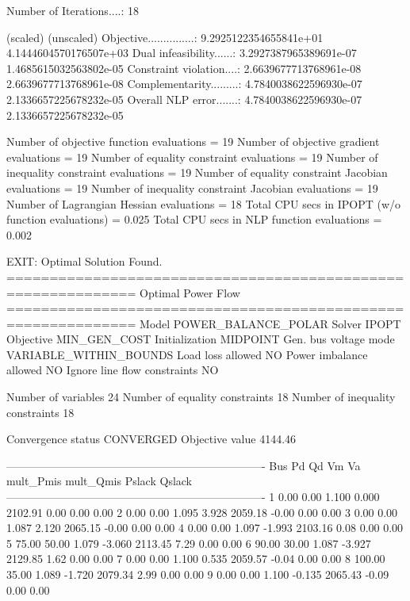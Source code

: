Number of Iterations....: 18

                                   (scaled)                 (unscaled)
Objective...............:   9.2925122354655841e+01    4.1444604570176507e+03
Dual infeasibility......:   3.2927387965389691e-07    1.4685615032563802e-05
Constraint violation....:   2.6639677713768961e-08    2.6639677713768961e-08
Complementarity.........:   4.7840038622596930e-07    2.1336657225678232e-05
Overall NLP error.......:   4.7840038622596930e-07    2.1336657225678232e-05


Number of objective function evaluations             = 19
Number of objective gradient evaluations             = 19
Number of equality constraint evaluations            = 19
Number of inequality constraint evaluations          = 19
Number of equality constraint Jacobian evaluations   = 19
Number of inequality constraint Jacobian evaluations = 19
Number of Lagrangian Hessian evaluations             = 18
Total CPU secs in IPOPT (w/o function evaluations)   =      0.025
Total CPU secs in NLP function evaluations           =      0.002

EXIT: Optimal Solution Found.
=============================================================
Optimal Power Flow
=============================================================
Model                               POWER_BALANCE_POLAR
Solver                              IPOPT
Objective                           MIN_GEN_COST
Initialization                      MIDPOINT
Gen. bus voltage mode               VARIABLE_WITHIN_BOUNDS
Load loss allowed                   NO
Power imbalance allowed             NO
Ignore line flow constraints        NO

Number of variables                 24
Number of equality constraints      18
Number of inequality constraints    18

Convergence status                  CONVERGED
Objective value                     4144.46

----------------------------------------------------------------------
Bus        Pd      Qd      Vm      Va      mult_Pmis      mult_Qmis      Pslack         Qslack        
----------------------------------------------------------------------
1         0.00    0.00   1.100   0.000      2102.91         0.00         0.00         0.00
2         0.00    0.00   1.095   3.928      2059.18        -0.00         0.00         0.00
3         0.00    0.00   1.087   2.120      2065.15        -0.00         0.00         0.00
4         0.00    0.00   1.097  -1.993      2103.16         0.08         0.00         0.00
5        75.00   50.00   1.079  -3.060      2113.45         7.29         0.00         0.00
6        90.00   30.00   1.087  -3.927      2129.85         1.62         0.00         0.00
7         0.00    0.00   1.100   0.535      2059.57        -0.04         0.00         0.00
8       100.00   35.00   1.089  -1.720      2079.34         2.99         0.00         0.00
9         0.00    0.00   1.100  -0.135      2065.43        -0.09         0.00         0.00

